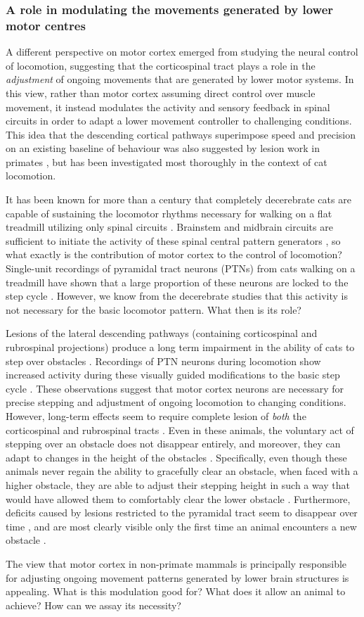 \subsubsection*{A role in modulating the movements generated by lower motor centres}

A different perspective on motor cortex emerged from studying the neural control of locomotion, suggesting that the corticospinal tract plays a role in the \emph{adjustment} of ongoing movements that are generated by lower motor systems. In this view, rather than motor cortex assuming direct control over muscle movement, it instead modulates the activity and sensory feedback in spinal circuits in order to adapt a lower movement controller to challenging conditions. This idea that the descending cortical pathways superimpose speed and precision on an existing baseline of behaviour was also suggested by lesion work in primates \cite{Lawrence1968a}, but has been investigated most thoroughly in the context of cat locomotion.

It has been known for more than a century that completely decerebrate cats are capable of sustaining the locomotor rhythms necessary for walking on a flat treadmill utilizing only spinal circuits \cite{GrahamBrown1911}. Brainstem and midbrain circuits are sufficient to initiate the activity of these spinal central pattern generators \cite{Grillner1973}, so what exactly is the contribution of motor cortex to the control of locomotion? Single-unit recordings of pyramidal tract neurons (PTNs) from cats walking on a treadmill have shown that a large proportion of these neurons are locked to the step cycle \cite{Armstrong1984a}. However, we know from the decerebrate studies that this activity is not necessary for the basic locomotor pattern. What then is its role?

Lesions of the lateral descending pathways (containing corticospinal and rubrospinal projections) produce a long term impairment in the ability of cats to step over obstacles \cite{Drew2002}. Recordings of PTN neurons during locomotion show increased activity during these visually guided modifications to the basic step cycle \cite{Drew1996}. These observations suggest that motor cortex neurons are necessary for precise stepping and adjustment of ongoing locomotion to changing conditions. However, long-term effects seem to require complete lesion of \emph{both} the corticospinal and rubrospinal tracts \cite{Drew2002}. Even in these animals, the voluntary act of stepping over an obstacle does not disappear entirely, and moreover, they can adapt to changes in the height of the obstacles \cite{Drew2002}. Specifically, even though these animals never regain the ability to gracefully clear an obstacle, when faced with a higher obstacle, they are able to adjust their stepping height in such a way that would have allowed them to comfortably clear the lower obstacle \cite{Drew2002}. Furthermore, deficits caused by lesions restricted to the pyramidal tract seem to disappear over time \cite{Liddell1944}, and are most clearly visible only the first time an animal encounters a new obstacle \cite{Liddell1944}.

The view that motor cortex in non-primate mammals is principally responsible for adjusting ongoing movement patterns generated by lower brain structures is appealing. What is this modulation good for? What does it allow an animal to achieve? How can we assay its necessity?
